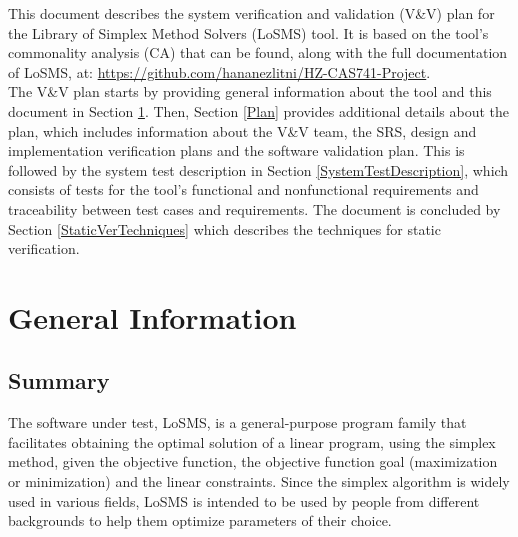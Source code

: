 \documentclass[12pt, titlepage]{article}
\newcommand{\progname}{Library of Simplex Method Solvers}
\newcommand{\famname}{LoSMS}
\begin{document}
\newpage

\tableofcontents

\listoftables

\newpage


This document describes the system verification and validation (V\&V) plan for
the \progname{} (\famname{}) tool.  
It is based on the tool's commonality analysis (CA) that can be found, along 
with the full documentation of \famname{}, at: 
\url{https://github.com/hananezlitni/HZ-CAS741-Project}.
 \\

The V\&V plan starts by providing general information about the tool and this 
document in Section \ref{GeneralInfo}. Then, Section \ref{Plan} provides 
additional details about the plan, which includes information about the V\&V 
team, the SRS, design and implementation verification plans and the software 
validation plan. This is followed by the system test description in Section 
\ref{SystemTestDescription}, which consists of tests for the tool's functional 
and nonfunctional requirements and traceability between test cases and 
requirements. The document is concluded by Section \ref{StaticVerTechniques} 
which describes the techniques for static verification.

\section{General Information} \label{GeneralInfo}

\subsection{Summary}

The software under test, \famname{}, is a general-purpose program family that 
facilitates obtaining the optimal solution of a linear program, using the 
simplex method, given the objective function, the objective function goal 
(maximization or minimization) and the linear constraints. Since the simplex 
algorithm is widely used in various fields, \famname{} is intended to be used 
by people from different backgrounds to help them optimize parameters of their 
choice.
\end{document}
